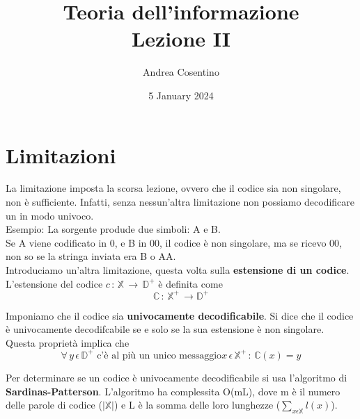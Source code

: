 \documentclass{article}
\title{Teoria dell'informazione\\Lezione II}
\author{Andrea Cosentino}
\date{5 January 2024}
\begin{document}
    \maketitle

    \section{Limitazioni}

    La limitazione imposta la scorsa lezione, ovvero che il codice sia non singolare, non è sufficiente. Infatti, senza nessun'altra limitazione non possiamo decodificare un in modo univoco.  \\

    \noindent Esempio: La sorgente produde due simboli: A e B. \\
    Se A viene codificato in 0, e B in 00, il codice è non singolare, ma se ricevo 00, non so se la stringa inviata era B o AA. \\


    \noindent Introduciamo un'altra limitazione, questa volta sulla \textbf{estensione di un codice}.  L'estensione del codice $c\,:\, \mathbb{X}\,\rightarrow \, \mathbb{D}^+$ è definita come $$\mathbb{C}\, : \, \mathbb{X}^+ \, \rightarrow \mathbb{D}^+$$

    Imponiamo che il codice sia \textbf{univocamente decodificabile}. Si dice che il codice è univocamente decodifcabile se e solo se la sua estensione è non singolare. Questa proprietà implica che
    $$\forall \, y \, \epsilon \, \mathbb{D}^+ \,\,\text{c'è al più un  unico messaggio}
    x\,\epsilon\,\mathbb{X}^+ \,: \, \mathbb{C}(x) = y$$

    \noindent Per determinare se un codice è univocamente decodificabile si usa l'algoritmo di \textbf{Sardinas-Patterson}. L'algoritmo ha complessita O(mL), dove m è il numero delle parole di codice ($|\mathbb{X}|$) e L è la somma delle loro lunghezze ($\sum_{x\epsilon\mathbb{X}} l(x)$). \\

    \def\firstcircle{(0,0) circle (1.5cm)}
    \def\secondcircle{(5:1cm) circle (3cm)}
    \vspace{10px}
\end{document}
